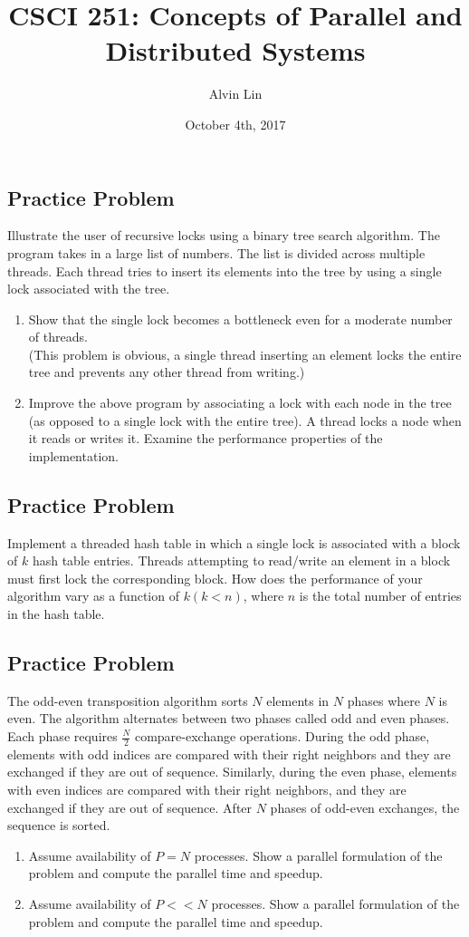 \documentclass[letterpaper, 12pt]{math}
\title{CSCI 251: Concepts of Parallel and Distributed Systems}
\author{Alvin Lin}
\date{October 4th, 2017}
\begin{document}
\maketitle

\subsection*{Practice Problem}
Illustrate the user of recursive locks using a binary tree search algorithm.
The program takes in a large list of numbers. The list is divided across
multiple threads. Each thread tries to insert its elements into the tree by
using a single lock associated with the tree.
\begin{enumerate}
  \item Show that the single lock becomes a bottleneck even for a moderate
  number of threads. \\
  (This problem is obvious, a single thread inserting an element locks the
  entire tree and prevents any other thread from writing.)
  \item Improve the above program by associating a lock with each node in the
  tree (as opposed to a single lock with the entire tree). A thread locks a node
  when it reads or writes it. Examine the performance properties of the
  implementation.
\end{enumerate}

\subsection*{Practice Problem}
Implement a threaded hash table in which a single lock is associated with a
block of \( k \) hash table entries. Threads attempting to read/write an element
in a block must first lock the corresponding block. How does the performance
of your algorithm vary as a function of \( k (k<n) \), where \( n \) is the
total number of entries in the hash table.

\subsection*{Practice Problem}
The odd-even transposition algorithm sorts \( N \) elements in \( N \) phases
where \( N \) is even. The algorithm alternates between two phases called odd
and even phases. Each phase requires \( \frac{N}{2} \) compare-exchange
operations. During the odd phase, elements with odd indices are compared with
their right neighbors and they are exchanged if they are out of sequence.
Similarly, during the even phase, elements with even indices are compared with
their right neighbors, and they are exchanged if they are out of sequence. After
\( N \) phases of odd-even exchanges, the sequence is sorted.
\begin{enumerate}
  \item Assume availability of \( P = N \) processes. Show a parallel
  formulation of the problem and compute the parallel time and speedup.
  \item Assume availability of \( P << N \) processes. Show a parallel
  formulation of the problem and compute the parallel time and speedup.
\end{enumerate}
\end{document}
